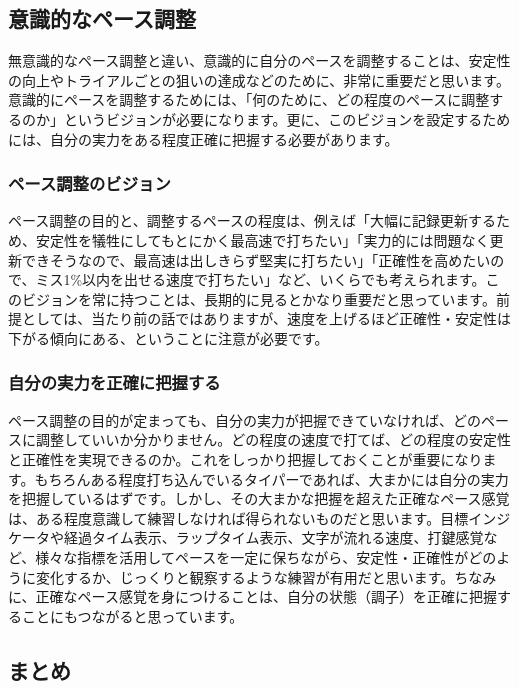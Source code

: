 \subsection{意識的なペース調整}

無意識的なペース調整と違い、意識的に自分のペースを調整することは、安定性の向上やトライアルごとの狙いの達成などのために、非常に重要だと思います。意識的にペースを調整するためには、「何のために、どの程度のペースに調整するのか」というビジョンが必要になります。更に、このビジョンを設定するためには、自分の実力をある程度正確に把握する必要があります。

\subsubsection*{ペース調整のビジョン}

ペース調整の目的と、調整するペースの程度は、例えば「大幅に記録更新するため、安定性を犠牲にしてもとにかく最高速で打ちたい」「実力的には問題なく更新できそうなので、最高速は出しきらず堅実に打ちたい」「正確性を高めたいので、ミス1\%以内を出せる速度で打ちたい」など、いくらでも考えられます。このビジョンを常に持つことは、長期的に見るとかなり重要だと思っています。前提としては、当たり前の話ではありますが、速度を上げるほど正確性・安定性は下がる傾向にある、ということに注意が必要です。

\subsubsection*{自分の実力を正確に把握する}

ペース調整の目的が定まっても、自分の実力が把握できていなければ、どのペースに調整していいか分かりません。どの程度の速度で打てば、どの程度の安定性と正確性を実現できるのか。これをしっかり把握しておくことが重要になります。もちろんある程度打ち込んでいるタイパーであれば、大まかには自分の実力を把握しているはずです。しかし、その大まかな把握を超えた正確なペース感覚は、ある程度意識して練習しなければ得られないものだと思います。目標インジケータや経過タイム表示、ラップタイム表示、文字が流れる速度、打鍵感覚など、様々な指標を活用してペースを一定に保ちながら、安定性・正確性がどのように変化するか、じっくりと観察するような練習が有用だと思います。ちなみに、正確なペース感覚を身につけることは、自分の状態（調子）を正確に把握することにもつながると思っています。

\subsection{まとめ}

